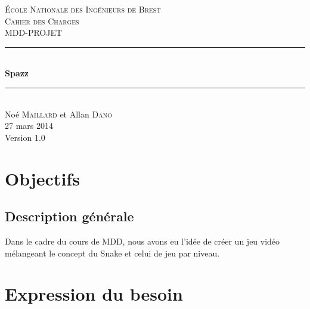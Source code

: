 \documentclass[a4paper,11pt]{scrartcl}
\begin{document}
\begin{titlepage}

\newcommand{\HRule}{\rule{\linewidth}{0.5mm}} %

\center %


\textsc{\LARGE École Nationale des Ingénieurs de Brest}\\[1.5cm]
\textsc{\Large Cahier des Charges}\\[0.5cm]
\textsc{\large MDD-PROJET}\\[0.5cm]


\HRule \\[0.4cm]
{\huge \bfseries Spazz}\\[0.4cm] %
\HRule \\[1.5cm]

\Large
Noé \textsc{Maillard} et Allan \textsc{Dano}\\[3cm]


{\large 27 mars 2014}\\[3cm]

{\large Version 1.0}


\vfill

\end{titlepage}
\newpage
\tableofcontents
\newpage
\section{Objectifs}

\subsection{Description générale}


Dans le cadre du cours de MDD, nous avons eu l'idée de créer un jeu vidéo mélangeant le concept du Snake et celui de jeu par niveau.

\section{Expression du besoin}
\end{document}

